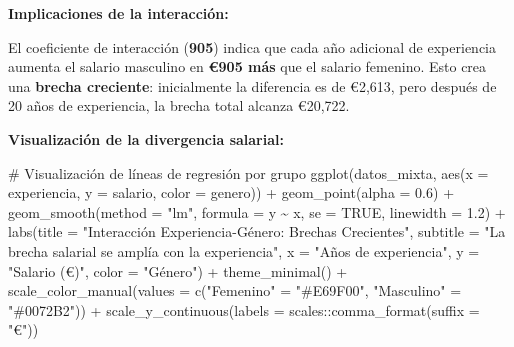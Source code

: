 \documentclass[
  letterpaper,
  DIV=11,
  numbers=noendperiod]{scrreprt}
\newenvironment{Shaded}{\begin{snugshade}}{\end{snugshade}}
\newcommand{\AttributeTok}[1]{\textcolor[rgb]{0.40,0.45,0.13}{#1}}
\newcommand{\CommentTok}[1]{\textcolor[rgb]{0.37,0.37,0.37}{#1}}
\newcommand{\ConstantTok}[1]{\textcolor[rgb]{0.56,0.35,0.01}{#1}}
\newcommand{\FloatTok}[1]{\textcolor[rgb]{0.68,0.00,0.00}{#1}}
\newcommand{\FunctionTok}[1]{\textcolor[rgb]{0.28,0.35,0.67}{#1}}
\newcommand{\NormalTok}[1]{\textcolor[rgb]{0.00,0.23,0.31}{#1}}
\newcommand{\OtherTok}[1]{\textcolor[rgb]{0.00,0.23,0.31}{#1}}
\newcommand{\SpecialCharTok}[1]{\textcolor[rgb]{0.37,0.37,0.37}{#1}}
\newcommand{\StringTok}[1]{\textcolor[rgb]{0.13,0.47,0.30}{#1}}
\begin{document}
\begin{tcolorbox}
\textbf{Implicaciones de la interacción:}

El coeficiente de interacción (\textbf{905}) indica que cada año
adicional de experiencia aumenta el salario masculino en \textbf{€905
más} que el salario femenino. Esto crea una \textbf{brecha creciente}:
inicialmente la diferencia es de €2,613, pero después de 20 años de
experiencia, la brecha total alcanza €20,722.

\textbf{Visualización de la divergencia salarial:}

\begin{Shaded}
\begin{Highlighting}[]
\CommentTok{\# Visualización de líneas de regresión por grupo}
\FunctionTok{ggplot}\NormalTok{(datos\_mixta, }\FunctionTok{aes}\NormalTok{(}\AttributeTok{x =}\NormalTok{ experiencia, }\AttributeTok{y =}\NormalTok{ salario, }\AttributeTok{color =}\NormalTok{ genero)) }\SpecialCharTok{+}
  \FunctionTok{geom\_point}\NormalTok{(}\AttributeTok{alpha =} \FloatTok{0.6}\NormalTok{) }\SpecialCharTok{+}
  \FunctionTok{geom\_smooth}\NormalTok{(}\AttributeTok{method =} \StringTok{"lm"}\NormalTok{, }\AttributeTok{formula =}\NormalTok{ y }\SpecialCharTok{\textasciitilde{}}\NormalTok{ x, }\AttributeTok{se =} \ConstantTok{TRUE}\NormalTok{, }\AttributeTok{linewidth =} \FloatTok{1.2}\NormalTok{) }\SpecialCharTok{+}
  \FunctionTok{labs}\NormalTok{(}\AttributeTok{title =} \StringTok{"Interacción Experiencia{-}Género: Brechas Crecientes"}\NormalTok{,}
       \AttributeTok{subtitle =} \StringTok{"La brecha salarial se amplía con la experiencia"}\NormalTok{,}
       \AttributeTok{x =} \StringTok{"Años de experiencia"}\NormalTok{, }\AttributeTok{y =} \StringTok{"Salario (€)"}\NormalTok{, }\AttributeTok{color =} \StringTok{"Género"}\NormalTok{) }\SpecialCharTok{+}
  \FunctionTok{theme\_minimal}\NormalTok{() }\SpecialCharTok{+}
  \FunctionTok{scale\_color\_manual}\NormalTok{(}\AttributeTok{values =} \FunctionTok{c}\NormalTok{(}\StringTok{"Femenino"} \OtherTok{=} \StringTok{"\#E69F00"}\NormalTok{, }\StringTok{"Masculino"} \OtherTok{=} \StringTok{"\#0072B2"}\NormalTok{)) }\SpecialCharTok{+}
  \FunctionTok{scale\_y\_continuous}\NormalTok{(}\AttributeTok{labels =}\NormalTok{ scales}\SpecialCharTok{::}\FunctionTok{comma\_format}\NormalTok{(}\AttributeTok{suffix =} \StringTok{"€"}\NormalTok{))}
\end{Highlighting}
\end{Shaded}


\end{tcolorbox}
\end{document}

